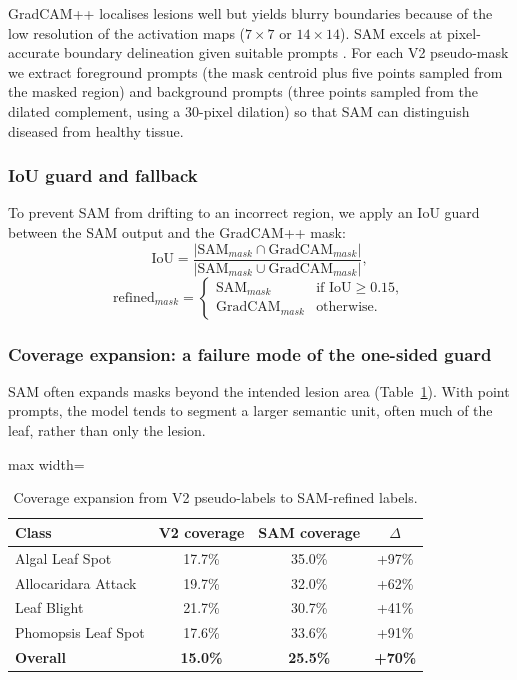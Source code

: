 \documentclass[final,5p,times,twocolumn,authoryear]{elsarticle}
\begin{document}
GradCAM++ localises lesions well but yields blurry boundaries because of the low resolution of the activation maps ($7\times7$ or $14\times14$). SAM excels at pixel-accurate boundary delineation given suitable prompts \citep{kirillov2023segment}. For each V2 pseudo-mask we extract foreground prompts (the mask centroid plus five points sampled from the masked region) and background prompts (three points sampled from the dilated complement, using a 30-pixel dilation) so that SAM can distinguish diseased from healthy tissue.

\subsubsection{IoU guard and fallback}

To prevent SAM from drifting to an incorrect region, we apply an IoU guard between the SAM output and the GradCAM++ mask:
\begin{equation}
\text{IoU} = \frac{|\text{SAM}_{mask} \cap \text{GradCAM}_{mask}|}{|\text{SAM}_{mask} \cup \text{GradCAM}_{mask}|},
\end{equation}
\begin{equation}
\text{refined}_{mask} = \begin{cases}
\text{SAM}_{mask} & \text{if IoU} \geq 0.15, \\
\text{GradCAM}_{mask} & \text{otherwise.}
\end{cases}
\end{equation}

\subsubsection{Coverage expansion: a failure mode of the one-sided guard}

SAM often expands masks beyond the intended lesion area (Table~\ref{tab:sam_expansion}). With point prompts, the model tends to segment a larger semantic unit, often much of the leaf, rather than only the lesion.

\begin{table}[!htbp]
\centering
\caption{Coverage expansion from V2 pseudo-labels to SAM-refined labels.}
\label{tab:sam_expansion}
\begin{adjustbox}{max width=\columnwidth}
\begin{tabular}{lccc}
\toprule
\textbf{Class} & \textbf{V2 coverage} & \textbf{SAM coverage} & \textbf{$\Delta$} \\
\midrule
Algal Leaf Spot     & 17.7\% & 35.0\% & +97\% \\
Allocaridara Attack & 19.7\% & 32.0\% & +62\% \\
Leaf Blight         & 21.7\% & 30.7\% & +41\% \\
Phomopsis Leaf Spot & 17.6\% & 33.6\% & +91\% \\
\midrule
\textbf{Overall}    & \textbf{15.0\%} & \textbf{25.5\%} & \textbf{+70\%} \\
\bottomrule
\end{tabular}
\end{adjustbox}
\end{table}
\end{document}

